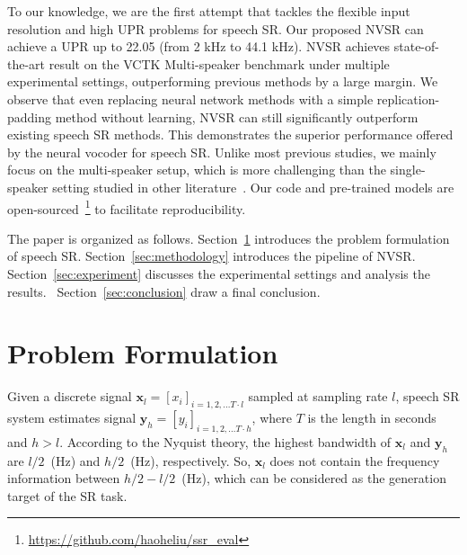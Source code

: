 \documentclass[a4paper]{article}
\def\Secref#1{Section~\ref{#1}}
\def\vx{{\mathbf{x}}}
\def\vy{{\mathbf{y}}}
\def\evx{{x}}
\def\evy{{y}}
\begin{document}
To our knowledge, we are the first attempt that tackles the flexible input resolution and high UPR problems for speech SR. Our proposed NVSR can achieve a UPR up to \num{22.05} (from \num{2} kHz to \num{44.1} kHz).
NVSR achieves state-of-the-art result on the VCTK Multi-speaker benchmark under multiple experimental settings, outperforming previous methods by a large margin. We observe that even replacing neural network methods with a simple replication-padding method without learning, NVSR can still significantly outperform existing speech SR methods. This demonstrates the superior performance offered by the neural vocoder for speech SR. Unlike most previous studies, we mainly focus on the multi-speaker setup, which is more challenging than the single-speaker setting studied in other literature~\cite{heming-towards-sr-wang2021towards}. Our code and pre-trained models are open-sourced~\footnote{ \url{https://github.com/haoheliu/ssr\_eval}} to facilitate reproducibility.


























The paper is organized as follows. \Secref{sec:problem-formulation} introduces the problem formulation of speech SR. \Secref{sec:methodology} introduces the pipeline of NVSR.
\Secref{sec:experiment} discusses the experimental settings and analysis the results. ~\Secref{sec:conclusion} draw a final conclusion.


\section{Problem Formulation}
\label{sec:problem-formulation}
Given a discrete signal $\vx_{l}=[\evx_{i}]_{i=1,2,...T\cdot l}$ sampled at sampling rate $l$, speech SR system estimates signal $\vy_{h}=[\evy_{i}]_{i=1,2,...T\cdot h}$, where $T$ is the length in seconds and $h>l$. According to the Nyquist theory, the highest bandwidth of $\vx_{l}$ and $\vy_{h}$ are $l/2$~(Hz) and $h/2$~(Hz), respectively. So, $\vx_{l}$ does not contain the frequency information between $h/2-l/2$~(Hz), which can be considered as the generation target of the SR task. 
\end{document}
